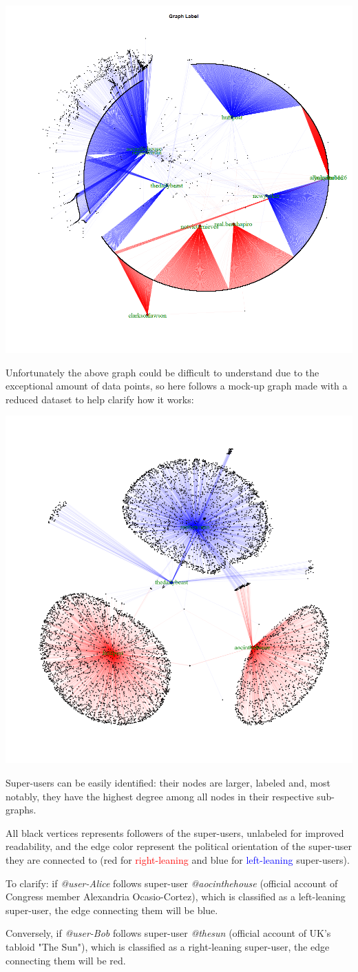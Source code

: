 \aCapo{}
\includegraphics[width = .5\textwidth]{images/final_combined_san_graph.png}

Unfortunately the above graph could be difficult to understand due to the exceptional amount of data points, so here follows a mock-up graph made with a reduced dataset to help clarify how it works:

\aCapo{}
\includegraphics[width = .5\textwidth]{images/mockUP_san.png}

Super-users can be easily identified: their nodes are larger, labeled and, most notably, they have the highest degree among all nodes in their respective sub-graphs. 

All black vertices represents followers of the super-users, unlabeled for improved readability, and the edge color represent the political orientation of the super-user they are connected to (red for \textcolor{red}{right-leaning} and blue for \textcolor{blue}{left-leaning} super-users). 

To clarify: if \textit{@user-Alice} follows super-user \textit{@aocinthehouse} (official account of Congress member Alexandria Ocasio-Cortez), which is classified as a left-leaning super-user, the edge connecting them will be blue. 

Conversely, if \textit{@user-Bob} follows super-user \textit{@thesun} (official account of UK's tabloid "The Sun"), which is classified as a right-leaning super-user, the edge connecting them will be red.

